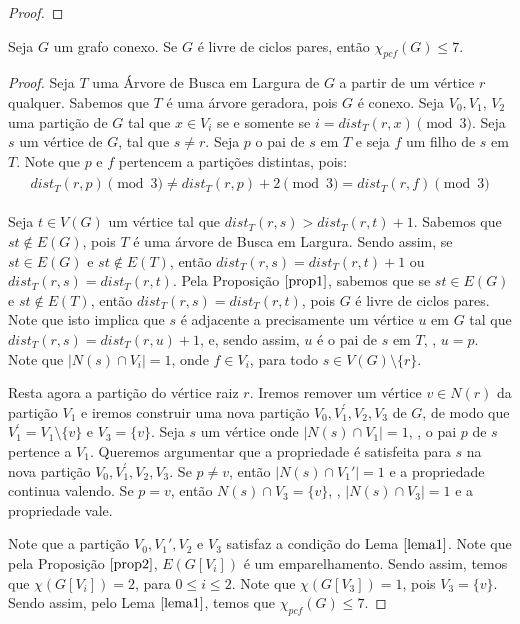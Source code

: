 \documentclass[12pt]{article}
\begin{document}
{\begin{proof}
\end{proof} 


\begin{teo}
	\label{teo1}
	Seja $G$ um grafo conexo. Se $G$ é livre de ciclos pares, então $\chi_{pcf}(G) \leq 7$.
\end{teo}

\begin{proof}
	Seja $T$ uma Árvore de Busca em Largura de $G$ a partir de um vértice $r$ qualquer. Sabemos que $T$ é uma árvore geradora, pois $G$ é conexo. Seja $V_0, V_1$, $V_2$ uma partição de $G$ tal que $x \in V_i$ se e somente se $i = dist_T(r, x) \pmod{3} $. Seja $s$ um vértice de $G$, tal que $s \neq r$. Seja $p$ o pai de $s$ em $T$ e seja $f$ um filho de $s$ em $T$.
	Note que $p$ e $f$ pertencem a partições distintas, pois:
	\begin{align}
		\begin{split}
			dist_T(r, p) \pmod{3} \neq dist_T(r, p) + 2 \pmod{3} = dist_T(r, f) \pmod{3}
		\end{split} 
	\end{align} 
	
	Seja $t \in V(G)$ um vértice tal que $dist_T(r, s) > dist_T(r, t) + 1$. Sabemos que $st \notin E(G)$, pois $T$ é uma árvore de Busca em Largura. Sendo assim, se $st \in E(G)$ e $st \notin E(T)$, então $dist_T(r, s) = dist_T(r, t) + 1$ ou $dist_T(r, s) = dist_T(r, t)$. Pela Proposição $\ref{prop1}$, sabemos que se $st \in E(G)$ e $st \notin E(T)$, então $dist_T(r, s) = dist_T(r, t)$, pois $G$ é livre de ciclos pares. Note que isto implica que $s$ é adjacente a precisamente um vértice $u$ em $G$ tal que $dist_T(r, s) = dist_T(r, u) + 1$, e, sendo assim, $u$ é o pai de $s$ em $T$, \ie, $u = p$. Note que $|N(s) \cap V_i| = 1$, onde $f \in V_i$, para todo $s \in V(G) \setminus\{r\}$. \newl
	
	Resta agora a partição do vértice raiz $r$. Iremos remover um vértice $v \in N(r)$ da partição $V_1$ e iremos construir uma nova partição $V_0, V^{'}_1, V_2, V_3$ de $G$, de modo que $V^{'}_1 = V_1\setminus\{v\}$ e $V_3 = \{v\}$. Seja $s$ um vértice onde $|N(s) \cap V_1| = 1$, \ie, o pai $p$ de $s$ pertence a $V_1$. Queremos argumentar que a propriedade é satisfeita para $s$ na nova partição $V_0, V^{'}_1, V_2, V_3$. Se $p \neq v$, então $|N(s) \cap V_1'| = 1$ e a propriedade continua valendo. Se $p = v$, então $N(s) \cap V_3 = \{v\}$, \ie, $ |N(s) \cap V_3| = 1$ e a propriedade vale. \newl
	
	Note que a partição $V_0, V_1', V_2 \text{ e } V_3$ satisfaz a condição do Lema $\ref{lema1}$. Note que pela Proposição $\ref{prop2}$, $E(G[V_i])$ é um emparelhamento. Sendo assim, temos que $\chi(G[V_i]) = 2$, para $0 \leq i \leq 2$. Note que $\chi(G[V_3]) = 1$, pois $V_3 = \{v\}$. Sendo assim, pelo Lema $\ref{lema1}$, temos que $\chi_{pcf}(G) \leq 7$.
	
\end{proof}  \newpage
}
\end{document}
